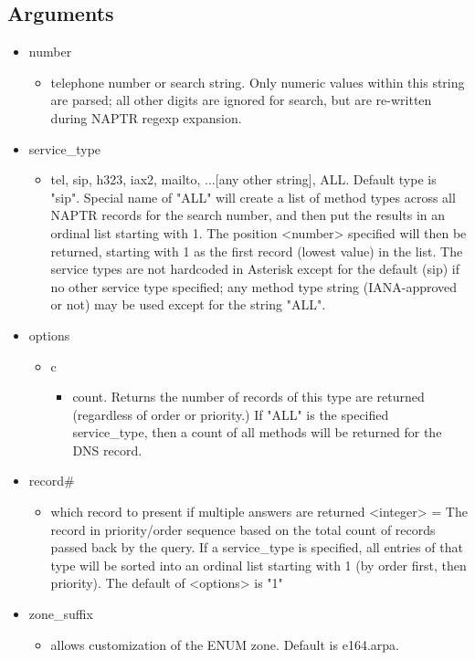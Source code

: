 \subsection{Arguments}

\begin{itemize}
  \item number
  \begin{itemize}
    \item telephone number or search string.  Only numeric values
    within this string are parsed; all other digits are ignored for
    search, but are re-written during NAPTR regexp expansion.
  \end{itemize}

  \item service\_type
  \begin{itemize}
     \item tel, sip, h323, iax2, mailto, ...[any other string],
     ALL. Default type is "sip".
     Special name of "ALL" will create a list of method types across
     all NAPTR records for the search number, and then put the results
     in an ordinal list starting with 1. The position <number>
     specified will then be returned, starting with 1 as the first
     record (lowest value) in the list.  The service types are not
     hardcoded in Asterisk except for the default (sip) if no other
     service type specified; any method type string (IANA-approved or
     not) may be used except for the string "ALL".
  \end{itemize}

  \item options
  \begin{itemize}
    \item c
    \begin{itemize}
      \item count. Returns the number of records of this type are returned
    (regardless of order or priority.)  If "ALL" is the specified
    service\_type, then a count of all methods will be returned for the
    DNS record.
    \end{itemize}
  \end{itemize}

  \item record\#
  \begin{itemize}
    \item which record to present if multiple answers are returned
    <integer> = The record in priority/order sequence based on the
    total count of records passed back by the query. If a service\_type
    is specified, all entries of that type will be sorted into an
    ordinal list starting with 1 (by order first, then priority).
    The default of <options> is "1"
  \end{itemize}

  \item zone\_suffix
  \begin{itemize}
    \item allows customization of the ENUM zone. Default is e164.arpa.
  \end{itemize}
\end{itemize}

